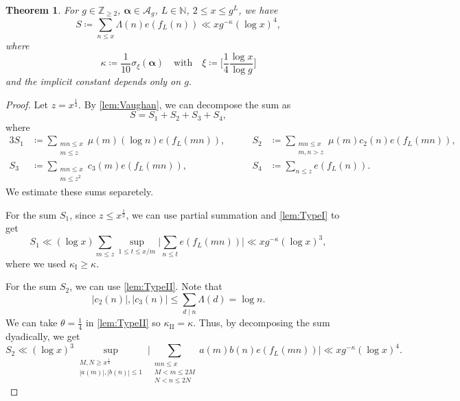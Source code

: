 \documentclass[hidelinks]{amsart}
\numberwithin{equation}{section}
\theoremstyle{plain}
\newtheorem{theorem}{Theorem}
\theoremstyle{definition}
\begin{document}
\begin{theorem}
\label{thm:exp_sum}
For $g\in\mathbb{Z}_{\ge2}$, $\bm{\alpha}\in\mathscr{A}_{g}$, $L\in\mathbb{N}$,
$2\le x\le g^{L}$, we have
\[
S
\coloneqq
\sum_{n\le x}\Lambda(n)e(f_{L}(n))
\ll
xg^{-\kappa}(\log x)^{4},
\]
where
\begin{equation}
\kappa
\coloneqq
\frac{1}{10}
\sigma_{\xi}(\bm{\alpha})
\quad\text{with}\quad
\xi
\coloneqq
\biggl[\frac{1}{4}\frac{\log x}{\log g}\biggr]
\end{equation}
and the implicit constant depends only on $g$.
\end{theorem}
\begin{proof}
Let $z=x^{\frac{1}{4}}$.
By \cref{lem:Vaughan}, we can decompose the sum as
\begin{equation}
\label{thm:exp_sum:decomp}
S=S_{1}+S_{2}+S_{3}+S_{4},
\end{equation}
where
\begin{alignat}{3}
S_{1}
&\coloneqq
\sum_{\substack{
mn\le x\\
m\le z
}}\mu(m)(\log n)e(f_{L}(mn)),
&\qquad
S_{2}
&\coloneqq
\sum_{\substack{
mn\le x\\
m,n>z
}}
\mu(m)c_{2}(n)
e(f_{L}(mn)),\\
S_{3}
&\coloneqq
\sum_{\substack{
mn\le x\\
m\le z^{2}
}}
c_{3}(m)e(f_{L}(mn)),
&\qquad
S_{4}
&\coloneqq
\sum_{n\le z}
e(f_{L}(n)).
\end{alignat}
We estimate these sums separetely.

For the sum $S_{1}$, since $z\le x^{\frac{1}{2}}$, we can use partial summation and \cref{lem:TypeI} to get
\begin{equation}
\label{thm:exp_sum:S1}
S_{1}
\ll
(\log x)
\sum_{m\le z}
\sup_{1\le t\le x/m}
\biggl|
\sum_{n\le t}e(f_{L}(mn))
\biggr|
\ll
xg^{-\kappa}(\log x)^{3},
\end{equation}
where we used $\kappa_{\mathrm{I}}\ge\kappa$.

For the sum $S_{2}$, we can use \cref{lem:TypeII}. Note that
\begin{equation}
\label{thm:exp_sum:coefficient_bound}
|c_{2}(n)|,
|c_{3}(n)|
\le
\sum_{d\mid n}\Lambda(d)
=
\log n.
\end{equation}
We can take $\theta=\frac{1}{4}$ in \cref{lem:TypeII} so $\kappa_{\mathrm{II}}=\kappa$.
Thus, by decomposing the sum dyadically, we get
\begin{equation}
\label{thm:exp_sum:S2}
S_{2}
\ll
(\log x)^{3}
\sup_{\substack{
M,N\ge x^{\frac{1}{4}}\\
|a(m)|,|b(n)|\le1
}}
\biggl|
\sum_{\substack{
mn\le x\\
M<m\le2M\\
N<n\le2N
}}
a(m)b(n)e(f_{L}(mn))
\biggr|
\ll
xg^{-\kappa}(\log x)^{4}.
\end{equation}


\end{proof}
\end{document}
